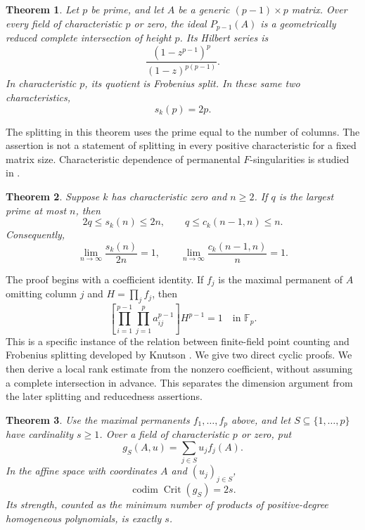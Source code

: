 \documentclass[11pt]{article}
\newtheorem{theorem}{Theorem}[section]
\theoremstyle{definition}\newtheorem{definition}[theorem]{Definition}
\theoremstyle{remark}\newtheorem{remark}[theorem]{Remark}
\DeclareMathOperator{\Crit}{Crit}
\DeclareMathOperator{\codim}{codim}
\newcommand{\F}{\mathbb F}
\numberwithin{equation}{section}
\begin{document}
\begin{theorem}\label{thm:prime}
Let $p$ be prime, and let $A$ be a generic $(p-1)\times p$ matrix.
Over every field of characteristic $p$ or zero, the ideal $P_{p-1}(A)$
is a geometrically reduced complete intersection of height $p$.
Its Hilbert series is
\begin{equation}\label{eq:hilbert}
 \frac{(1-z^{p-1})^p}{(1-z)^{p(p-1)}}.
\end{equation}
In characteristic $p$, its quotient is Frobenius split. In these
same two characteristics,
\begin{equation}\label{eq:primecodim}
 s_k(p)=2p.
\end{equation}
\end{theorem}

The splitting in this theorem uses the prime equal to the number of
columns. The assertion is not a statement of splitting in every
positive characteristic for a fixed matrix size. Characteristic
dependence of permanental $F$-singularities is studied in \cite{Chau}.

\begin{theorem}\label{thm:alln}
Suppose $k$ has characteristic zero and $n\ge2$. If $q$ is the
largest prime at most $n$, then
\begin{equation}\label{eq:alln}
 2q\le s_k(n)\le2n,\qquad q\le c_k(n-1,n)\le n.
\end{equation}
Consequently,
\[
 \lim_{n\to\infty}\frac{s_k(n)}{2n}=1,
 \qquad
 \lim_{n\to\infty}\frac{c_k(n-1,n)}{n}=1.
\]
\end{theorem}

The proof begins with a coefficient identity. If $f_j$ is the
maximal permanent of $A$ omitting column $j$ and $H=\prod_jf_j$,
then
\begin{equation}\label{eq:introtrace}
 \left[\prod_{i=1}^{p-1}\prod_{j=1}^{p}a_{ij}^{p-1}\right]
 H^{p-1}=1\quad\text{in }\F_p.
\end{equation}
This is a specific instance of the relation between finite-field
point counting and Frobenius splitting developed by Knutson
\cite{Knutson}. We give two direct cyclic proofs. We then derive a
local rank estimate from the nonzero coefficient, without assuming a
complete intersection in advance. This separates the dimension
argument from the later splitting and reducedness assertions.

\begin{theorem}\label{thm:partial}
Use the maximal permanents $f_1,\ldots,f_p$ above, and let
$S\subseteq\{1,\ldots,p\}$ have cardinality $s\ge1$. Over a field
of characteristic $p$ or zero, put
\[
 g_S(A,u)=\sum_{j\in S}u_jf_j(A).
\]
In the affine space with coordinates $A$ and $(u_j)_{j\in S}$,
\[
 \codim\Crit(g_S)=2s.
\]
Its strength, counted as the minimum number of products of
positive-degree homogeneous polynomials, is exactly $s$.
\end{theorem}
\end{document}

